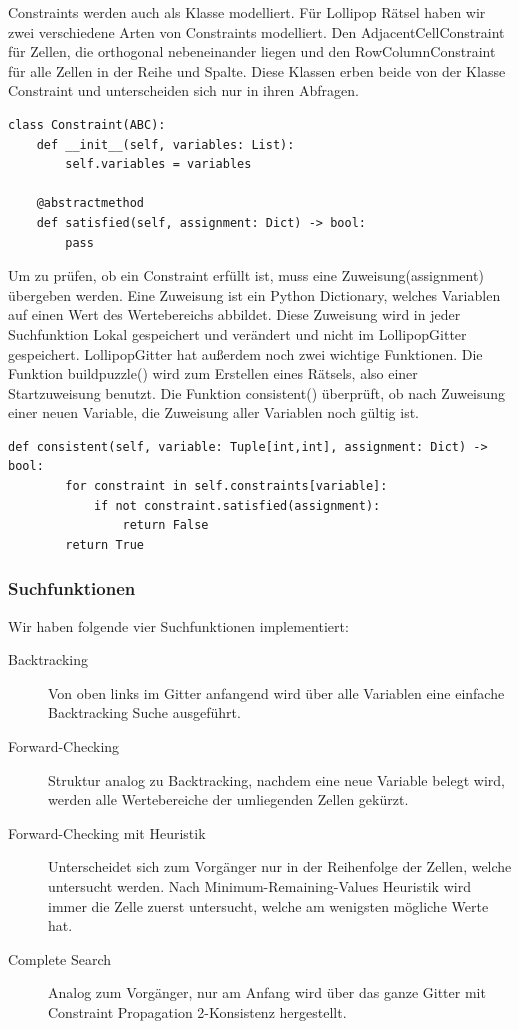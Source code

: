 \documentclass{article}
\begin{document}
Constraints werden auch als Klasse modelliert.
Für Lollipop Rätsel haben wir zwei verschiedene Arten von Constraints modelliert.
Den AdjacentCellConstraint für Zellen, die orthogonal nebeneinander liegen und den RowColumnConstraint für alle Zellen in
der Reihe und Spalte.
Diese Klassen erben beide von der Klasse Constraint und unterscheiden sich nur in ihren Abfragen.
\begin{lstlisting}[label={lst:ConstraintKlasse}]
    class Constraint(ABC):
    def __init__(self, variables: List):
        self.variables = variables

    @abstractmethod
    def satisfied(self, assignment: Dict) -> bool:
        pass
\end{lstlisting}
Um zu prüfen, ob ein Constraint erfüllt ist, muss eine Zuweisung(assignment) übergeben werden.
Eine Zuweisung ist ein Python Dictionary, welches Variablen auf einen Wert des Wertebereichs abbildet.
Diese Zuweisung wird in jeder Suchfunktion Lokal gespeichert und verändert und nicht im LollipopGitter gespeichert.\newline
LollipopGitter hat außerdem noch zwei wichtige Funktionen.
Die Funktion build\underbar puzzle() wird zum Erstellen eines Rätsels, also einer Startzuweisung benutzt.
Die Funktion consistent() überprüft, ob nach Zuweisung einer neuen Variable, die Zuweisung aller Variablen noch gültig ist.
\begin{lstlisting}[label={lst:consistent}]
  def consistent(self, variable: Tuple[int,int], assignment: Dict) -> bool:
        for constraint in self.constraints[variable]:
            if not constraint.satisfied(assignment):
                return False
        return True
\end{lstlisting}

\subsubsection{Suchfunktionen}
Wir haben folgende vier Suchfunktionen implementiert:
\begin{description}
    \item [Backtracking] Von oben links im Gitter anfangend wird über alle Variablen eine einfache Backtracking Suche ausgeführt.
    \item[Forward-Checking] Struktur analog zu Backtracking, nachdem eine neue Variable belegt wird, werden alle Wertebereiche der umliegenden Zellen gekürzt.
    \item[Forward-Checking mit Heuristik] Unterscheidet sich zum Vorgänger nur in der Reihenfolge der Zellen, welche untersucht werden.
    Nach Minimum-Remaining-Values Heuristik wird immer die Zelle zuerst untersucht, welche am wenigsten mögliche Werte hat.
    \item[Complete Search] Analog zum Vorgänger, nur am Anfang wird über das ganze Gitter mit Constraint Propagation 2-Konsistenz hergestellt.
\end{description}
\end{document}
